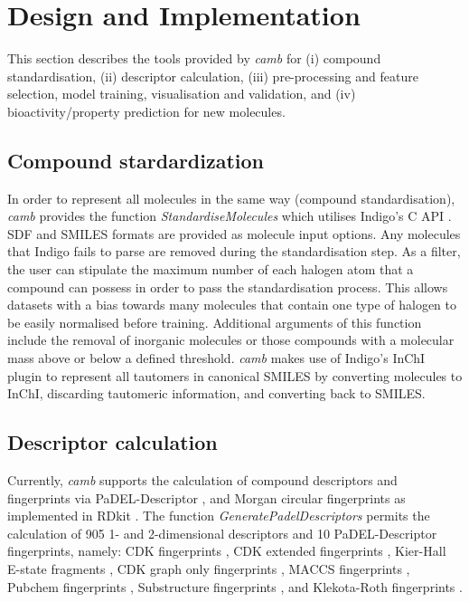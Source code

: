 \documentclass{bmcart}
\begin{document}
\section*{Design and Implementation}
This section describes the tools provided by {\it camb} 
for (i) compound standardisation, (ii) 
descriptor calculation, 
(iii) pre-processing and feature selection, model training, visualisation and validation, and (iv) bioactivity/property prediction for new molecules.

\subsection*{Compound stardardization}
In order to represent all molecules in the same 
way (compound standardisation),
{\it camb}  provides the function {\it StandardiseMolecules} which utilises Indigo's C API \cite{Indigo}.
SDF and SMILES formats are provided as molecule input options. Any molecules that Indigo fails to parse are removed during the standardisation step.
As a filter, the user can stipulate the maximum number of each halogen atom that a compound can possess in order to pass the standardisation process. This allows datasets with a bias towards many molecules that contain one type of halogen to be easily normalised before training.
Additional arguments of this function include the removal of inorganic molecules
or those compounds with a molecular mass above or below a defined threshold.
{\it camb} makes use of Indigo's InChI \cite{inchi} plugin to represent all tautomers in canonical SMILES
by converting molecules to InChI, discarding tautomeric information, and converting back to SMILES.  

\subsection*{Descriptor calculation} 

Currently, {\it camb} supports the calculation of compound descriptors and fingerprints via PaDEL-Descriptor \cite{padel},
and Morgan circular fingerprints \cite{extended_fp} as implemented in RDkit \cite{rdkit}.
The function {\it GeneratePadelDescriptors} permits the calculation of 905 1- and 2-dimensional descriptors and 10 PaDEL-Descriptor fingerprints, namely: 
CDK fingerprints \cite{CDK}, CDK extended fingerprints \cite{CDK}, Kier-Hall E-state fragments \cite{state_fp}, CDK graph only fingerprints \cite{CDK}, MACCS fingerprints \cite{maccs},
Pubchem fingerprints \cite{pubchem}, Substructure fingerprints \cite{obabel}, and Klekota-Roth fingerprints \cite{privileged_substructures}.
\end{document}
